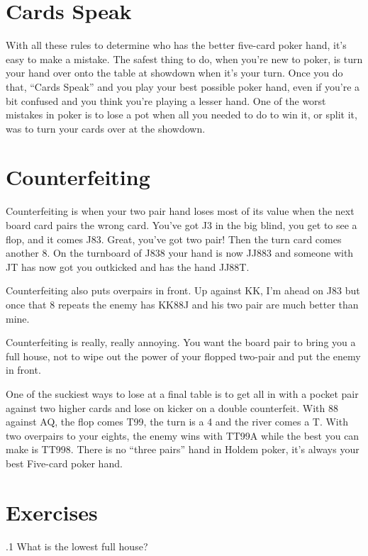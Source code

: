 \section{Cards Speak}

With all these rules to determine who has the better five-card poker
hand, it's easy to make a mistake. The safest thing to do, when you're
new to poker, is turn your hand over onto the table at showdown when
it's your turn. Once you do that, ``Cards Speak'' and you play your
best possible poker hand, even if you're a bit confused and you think
you're playing a lesser hand. One of the worst mistakes in poker is to
lose a pot when all you needed to do to win it, or split it, was to
turn your cards over at the showdown.

\section{Counterfeiting}

Counterfeiting is when your two pair hand loses most of its value when
the next board card pairs the wrong card. You've got J3 in the big
blind, you get to see a flop, and it comes J83. Great, you've got two
pair! Then the turn card comes another 8. On the turnboard of J838
your hand is now JJ883 and someone with JT has now got you outkicked
and has the hand JJ88T.

Counterfeiting also puts overpairs in front. Up against KK, I'm ahead
on J83 but once that 8 repeats the enemy has KK88J and his two pair
are much better than mine.

Counterfeiting is really, really annoying. You want the board pair to
bring you a full house, not to wipe out the power of your flopped
two-pair and put the enemy in front.

One of the suckiest ways to lose at a final table is to get all in
with a pocket pair against two higher cards and lose on kicker on a
double counterfeit. With 88 against AQ, the flop comes T99,
the turn is a 4 and the river comes a T. With two overpairs to your
eights, the enemy wins with TT99A while the best you can make is
TT998. There is no ``three pairs'' hand in Holdem poker, it's always
your best Five-card poker hand.

\section{Exercises}

.1 What is the lowest full house?
